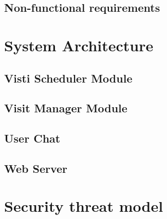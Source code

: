 \documentclass[11pt,a4paper]{article}
\begin{document}
\subsection{Non-functional requirements}


\section{System Architecture}

\subsection{Visti Scheduler Module}

\subsection{Visit Manager Module}

\subsection{User Chat}

\subsection{Web Server}


\section{Security threat model}
\end{document}
